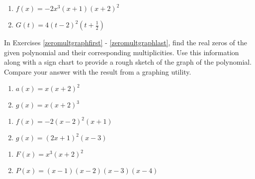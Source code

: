 \documentclass{ximera}
\begin{document}
\begin{enumerate}
\setcounter{enumi}{\value{HW}}

\item $f(x) = -2x^3(x+1)(x+2)^2$
\item $G(t) = 4(t-2)^2\left(t+\frac{1}{2}\right)$ \label{polyfactslast}

\setcounter{HW}{\value{enumi}}
\end{enumerate}


\label{polygraphexercise}

In Exercises \ref{zeromultgraphfirst} - \ref{zeromultgraphlast}, find the real zeros of the given polynomial and their corresponding multiplicities.  Use this information along with a sign chart to provide a rough sketch of the graph of the polynomial.  Compare your answer with the result from a graphing utility.

\begin{enumerate}
\setcounter{enumi}{\value{HW}}

\item $a(x) = x(x + 2)^{2}$ \label{zeromultgraphfirst}
\item $g(x) = x(x + 2)^{3}$

\setcounter{HW}{\value{enumi}}
\end{enumerate}


\begin{enumerate}
\setcounter{enumi}{\value{HW}}

\item $f(x) = -2(x-2)^2(x+1)$
\item $g(x) = (2x+1)^2(x-3)$

\setcounter{HW}{\value{enumi}}
\end{enumerate}


\begin{enumerate}
\setcounter{enumi}{\value{HW}}

\item $F(x) = x^{3}(x + 2)^{2}$
\item $P(x) = (x - 1)(x - 2)(x - 3)(x - 4)$

\setcounter{HW}{\value{enumi}}
\end{enumerate}
\end{document}

